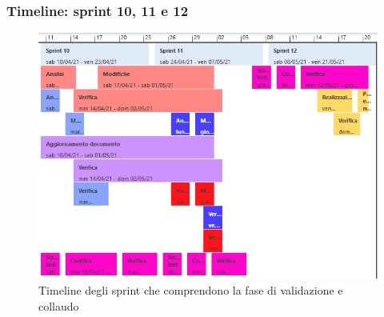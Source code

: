 \subsubsection{Timeline: sprint 10, 11 e 12}
\begin{figure}[H]
    \centering
    \includegraphics[scale = 0.75]{components/img/sprint10-11-12.png}
    \caption{Timeline degli sprint che comprendono la  fase di validazione e collaudo}
    \label{fig:Timeline,sprint 10, 11 e 12, fase di validazione e collaudo}
\end{figure}